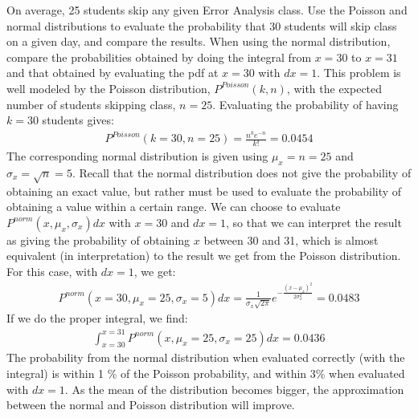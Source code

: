 \begin{example}{}{On average, 25 students skip any given Error Analysis class. Use the Poisson and normal distributions to evaluate the probability that 30 students will skip class on a given day, and compare the results. When using the normal distribution, compare the probabilities obtained by doing the integral from $x=30$ to $x=31$ and that obtained by evaluating the pdf at $x=30$ with $dx=1$.}{}
This problem is well modeled by the Poisson distribution, $P^{Poisson}(k,n)$, with the expected number of students skipping class, $n=25$. Evaluating the probability of having $k=30$ students gives:
\begin{align*}
P^{Poisson}(k=30,n=25)=\frac{n^k e^{-n}}{k!} =0.0454
\end{align*}
The corresponding normal distribution is given using $\mu_x=n=25$ and $\sigma_x=\sqrt{n}=5$. Recall that the normal distribution does not give the probability of obtaining an exact value, but rather must be used to evaluate the probability of obtaining a value within a certain range. We can choose to evaluate $P^{norm}(x,\mu_x,\sigma_x)dx$ with $x=30$ and $dx=1$, so that we can interpret the result as giving the probability of obtaining $x$ between 30 and 31, which is almost equivalent (in interpretation) to the result we get from the Poisson distribution. For this case, with $dx=1$, we get:
\begin{align*}
P^{norm}(x=30,\mu_x=25,\sigma_x=5)dx=\frac{1}{\sigma_x\sqrt{2\pi}}e^{-\frac{(x-\mu_x)^2}{2\sigma_x^2}}=0.0483
\end{align*}
If we do the proper integral, we find:
\begin{align*}
\int_{x=30}^{x=31}P^{norm}(x,\mu_x=25,\sigma_x=25)dx=0.0436
\end{align*}
The probability from the normal distribution when evaluated correctly (with the integral) is within 1 \% of the Poisson probability, and within 3\% when evaluated with $dx=1$. As the mean of the distribution becomes bigger, the approximation between the normal and Poisson distribution will improve.


\end{example}
